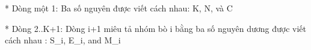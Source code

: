 * Dòng một 1: Ba số nguyên được viết cách nhau: K, N, và C  

   * Dòng 2..K+1: Dòng i+1 miêu tả nhóm bò i bằng ba số nguyên dương được viết cách nhau : S\_i, E\_i, and M\_i  

\